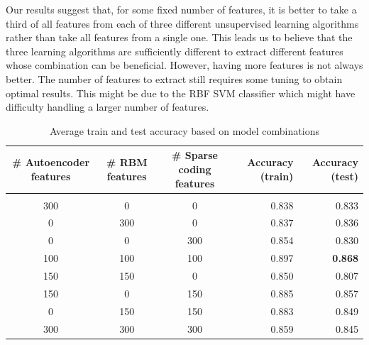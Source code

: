 \documentclass{article} %
\begin{document}
Our results suggest that, for some fixed number of features, it is better to take a third of all features from each of three different unsupervised learning algorithms rather than take all features from a single one. This leads us to believe that the three learning algorithms are sufficiently different to extract different features whose combination can be beneficial. However, having more features is not always better. The number of features to extract still requires some tuning to obtain optimal results. This might be due to the RBF SVM classifier which might have difficulty handling a larger number of features.




\begin{table}[h]
\caption{Average train and test accuracy based on model combinations}
\label{results-table}
\begin{center}
\begin{adjustbox}{width=1\textwidth}
\begin{tabular}{ccc|rr}

\multicolumn{1}{c}{\bf \# Autoencoder features}  
&\multicolumn{1}{c}{\bf \# RBM features}  
&\multicolumn{1}{c}{\bf \# Sparse coding features} 
&\multicolumn{1}{|r}{\bf Accuracy (train)}
&\multicolumn{1}{r}{\bf Accuracy (test)}
\\ \hline \\	
300 & 0 & 0 & 0.838 & 0.833 \\
0 & 300 & 0 & 0.837 & 0.836 \\
0 & 0 & 300 & 0.854 & 0.830  \\
100 & 100 & 100 & 0.897 & \textbf{0.868} \\
150 & 150 & 0 & 0.850 & 0.807 \\
150 & 0 & 150 & 0.885 & 0.857 \\
0 & 150 & 150 & 0.883& 0.849 \\
300 & 300 & 300 & 0.859 & 0.845 \\

\end{tabular}
\end{adjustbox}
\end{center}
\end{table}
\end{document}
